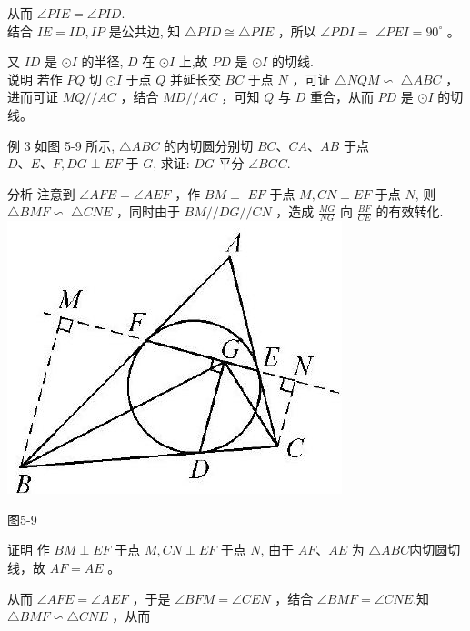 \documentclass[10pt]{article}
\begin{document}
从而 $\angle P I E=\angle P I D$.\\
结合 $I E=I D, I P$ 是公共边, 知 $\triangle P I D \cong \triangle P I E$ ，所以 $\angle P D I=$ $\angle P E I=90^{\circ}$ 。

又 $I D$ 是 $\odot I$ 的半径, $D$ 在 $\odot I$ 上,故 $P D$ 是 $\odot I$ 的切线.\\
说明 若作 $P Q$ 切 $\odot I$ 于点 $Q$ 并延长交 $B C$ 于点 $N$ ，可证 $\triangle N Q M \backsim$ $\triangle A B C$ ，进而可证 $M Q / / A C$ ，结合 $M D / / A C$ ，可知 $Q$ 与 $D$ 重合，从而 $P D$ 是 $\odot I$ 的切线。

例 3 如图 5-9 所示, $\triangle A B C$ 的内切圆分别切 $B C 、 C A 、 A B$ 于点 $D 、 E 、 F, D G \perp E F$ 于 $G$, 求证: $D G$ 平分 $\angle B G C$.

分析 注意到 $\angle A F E=\angle A E F$ ，作 $B M \perp$ $E F$ 于点 $M, C N \perp E F$ 于点 $N$, 则 $\triangle B M F \backsim$ $\triangle C N E$ ，同时由于 $B M / / D G / / C N$ ，造成 $\frac{M G}{N G}$ 向 $\frac{B F}{C E}$ 的有效转化.\\
\includegraphics[max width=\textwidth, center]{2024_10_30_66b8e5e701da2093c133g-036}

图5-9

证明 作 $B M \perp E F$ 于点 $M, C N \perp E F$ 于点 $N$, 由于 $A F 、 A E$ 为 $\triangle A B C$内切圆切线，故 $A F=A E$ 。

从而 $\angle A F E=\angle A E F$ ，于是 $\angle B F M=\angle C E N$ ，结合 $\angle B M F=\angle C N E$,知 $\triangle B M F \backsim \triangle C N E$ ，从而
\end{document}
